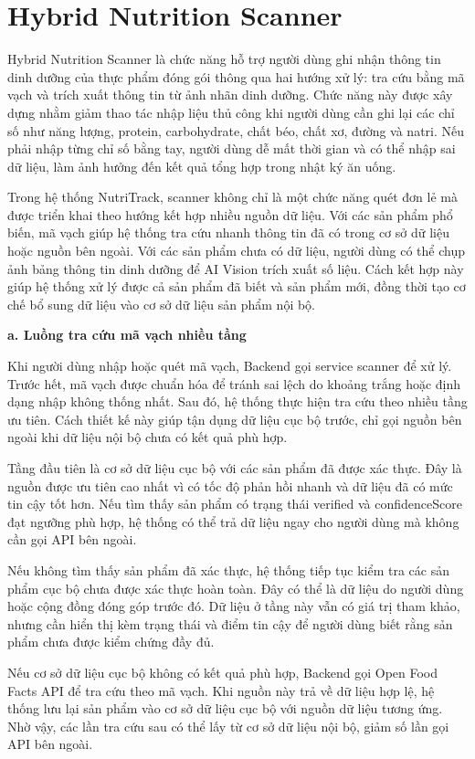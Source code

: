\documentclass[12pt, a4paper]{report}
\begin{document}
\section{Hybrid Nutrition Scanner}Hybrid Nutrition Scanner là chức năng hỗ trợ người dùng ghi nhận thông tin dinh dưỡng của thực phẩm đóng gói thông qua hai hướng xử lý: tra cứu bằng mã vạch và trích xuất thông tin từ ảnh nhãn dinh dưỡng. Chức năng này được xây dựng nhằm giảm thao tác nhập liệu thủ công khi người dùng cần ghi lại các chỉ số như năng lượng, protein, carbohydrate, chất béo, chất xơ, đường và natri. Nếu phải nhập từng chỉ số bằng tay, người dùng dễ mất thời gian và có thể nhập sai dữ liệu, làm ảnh hưởng đến kết quả tổng hợp trong nhật ký ăn uống.

Trong hệ thống NutriTrack, scanner không chỉ là một chức năng quét đơn lẻ mà được triển khai theo hướng kết hợp nhiều nguồn dữ liệu. Với các sản phẩm phổ biến, mã vạch giúp hệ thống tra cứu nhanh thông tin đã có trong cơ sở dữ liệu hoặc nguồn bên ngoài. Với các sản phẩm chưa có dữ liệu, người dùng có thể chụp ảnh bảng thông tin dinh dưỡng để AI Vision trích xuất số liệu. Cách kết hợp này giúp hệ thống xử lý được cả sản phẩm đã biết và sản phẩm mới, đồng thời tạo cơ chế bổ sung dữ liệu vào cơ sở dữ liệu sản phẩm nội bộ.

\textbf{a. Luồng tra cứu mã vạch nhiều tầng}

Khi người dùng nhập hoặc quét mã vạch, Backend gọi service scanner để xử lý. Trước hết, mã vạch được chuẩn hóa để tránh sai lệch do khoảng trắng hoặc định dạng nhập không thống nhất. Sau đó, hệ thống thực hiện tra cứu theo nhiều tầng ưu tiên. Cách thiết kế này giúp tận dụng dữ liệu cục bộ trước, chỉ gọi nguồn bên ngoài khi dữ liệu nội bộ chưa có kết quả phù hợp.

Tầng đầu tiên là cơ sở dữ liệu cục bộ với các sản phẩm đã được xác thực. Đây là nguồn được ưu tiên cao nhất vì có tốc độ phản hồi nhanh và dữ liệu đã có mức tin cậy tốt hơn. Nếu tìm thấy sản phẩm có trạng thái verified và confidenceScore đạt ngưỡng phù hợp, hệ thống có thể trả dữ liệu ngay cho người dùng mà không cần gọi API bên ngoài.

Nếu không tìm thấy sản phẩm đã xác thực, hệ thống tiếp tục kiểm tra các sản phẩm cục bộ chưa được xác thực hoàn toàn. Đây có thể là dữ liệu do người dùng hoặc cộng đồng đóng góp trước đó. Dữ liệu ở tầng này vẫn có giá trị tham khảo, nhưng cần hiển thị kèm trạng thái và điểm tin cậy để người dùng biết rằng sản phẩm chưa được kiểm chứng đầy đủ.

Nếu cơ sở dữ liệu cục bộ không có kết quả phù hợp, Backend gọi Open Food Facts API để tra cứu theo mã vạch. Khi nguồn này trả về dữ liệu hợp lệ, hệ thống lưu lại sản phẩm vào cơ sở dữ liệu cục bộ với nguồn dữ liệu tương ứng. Nhờ vậy, các lần tra cứu sau có thể lấy từ cơ sở dữ liệu nội bộ, giảm số lần gọi API bên ngoài.
\end{document}
